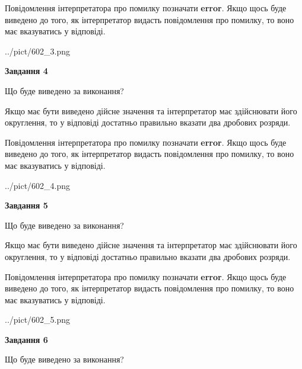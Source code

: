 \documentclass[12pt, ukrainian]{article}
\begin{document}
{\begin {Large}
Повідомлення інтерпретатора про помилку позначати \textbf{error}.
Якщо щось буде виведено до того, як інтерпретатор видасть повідомлення про помилку, 
то воно має вказуватись у відповіді. \par

\begin{center}
	{../pict/602_3.png}
\end{center}
\newpage

{\begin {center}\textbf{Завдання 4}\end {center}}\par
Що буде виведено за виконання? \par

Якщо має бути виведено дійсне значення та інтерпретатор має здійснювати його округлення, 
то у відповіді достатньо правильно вказати два дробових розряди.

Повідомлення інтерпретатора про помилку позначати \textbf{error}.
Якщо щось буде виведено до того, як інтерпретатор видасть повідомлення про помилку, 
то воно має вказуватись у відповіді. \par

\begin{center}
	{../pict/602_4.png}
\end{center}
\newpage

{\begin {center}\textbf{Завдання 5}\end {center}}\par
Що буде виведено за виконання? \par

Якщо має бути виведено дійсне значення та інтерпретатор має здійснювати його округлення, 
то у відповіді достатньо правильно вказати два дробових розряди.

Повідомлення інтерпретатора про помилку позначати \textbf{error}.
Якщо щось буде виведено до того, як інтерпретатор видасть повідомлення про помилку, 
то воно має вказуватись у відповіді. \par

\begin{center}
	{../pict/602_5.png}
\end{center}
\newpage

{\begin {center}\textbf{Завдання 6}\end {center}}\par
Що буде виведено за виконання? \par


\end{Large}}
\end{document}
